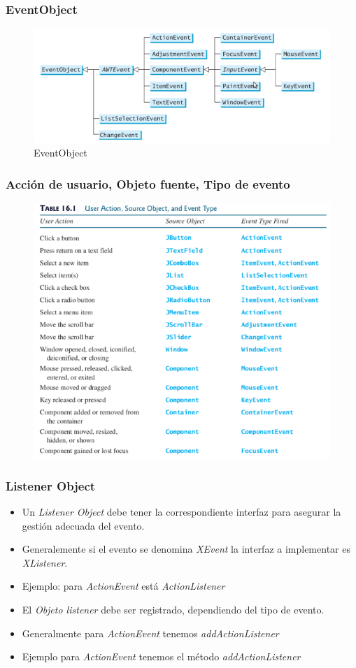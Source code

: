 \documentclass{beamer}
\begin{document}
\begin{frame}
\frametitle{EventObject}
\begin{figure}
\includegraphics[width=\textwidth]{imagenes/event.png}
\caption{EventObject}
\end{figure}
\end{frame}


\begin{frame}
\frametitle{Acción de usuario, Objeto fuente, Tipo de evento}
\begin{figure}
\includegraphics[scale=0.5]{imagenes/uot.png}
\end{figure}
\end{frame}

\begin{frame}[fragile]
\frametitle{Listener Object}
\begin{itemize}[<+->]
\item Un \emph{Listener Object} debe tener la correspondiente interfaz para asegurar la gestión adecuada del evento.
\item Generalemente si el evento se denomina \emph{XEvent} la interfaz a implementar es \emph{XListener}.
\item Ejemplo: para \emph{ActionEvent} está \emph{ActionListener}
\item El \emph{Objeto listener} debe ser registrado, dependiendo del tipo de evento.
\item Generalmente para \emph{ActionEvent} tenemos \emph{addActionListener}
\item Ejemplo para \emph{ActionEvent} tenemos el método \emph{addActionListener}
\end{itemize}
\end{frame}
\end{document}
